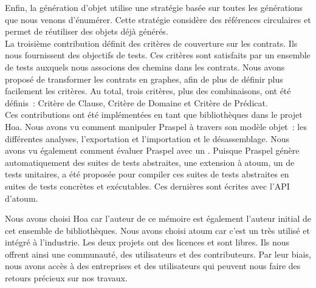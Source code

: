 Enfin, la génération d'objet utilise une stratégie basée sur toutes les
générations que nous venons d'énumérer. Cette stratégie considère des références
circulaires et permet de réutiliser des objets déjà générés. \\

La troisième contribution définit des critères de couverture sur les contrats.
Ils nous fournissent des objectifs de tests. Ces critères sont satisfaits par un
ensemble de tests auxquels nous associons des chemins dans les contrats. Nous
avons proposé de transformer les contrats en graphes, afin de plus de définir
plus facilement les critères. Au total, trois critères, plus des combinaisons,
ont été définis~: Critère de Clause, Critère de Domaine et Critère de Prédicat.
\\

Ces contributions ont été implémentées en tant que bibliothèques dans le projet
Hoa. Nous avons vu comment manipuler Praspel à travers son modèle objet~: les
différentes analyses, l'exportation et l'importation et le désassemblage. Nous
avons vu également comment évaluer Praspel avec un . Puisque Praspel génère automatiquement des suites de tests
abstraites, une extension à atoum, un  de tests unitaires,
a été proposée pour compiler ces suites de tests abstraites en suites de tests
concrètes et exécutables. Ces dernières sont écrites avec l'API d'atoum.

Nous avons choisi Hoa car l'auteur de ce mémoire est également l'auteur initial
de cet ensemble de bibliothèques. Nous avons choisi atoum car c'est un
 très utilisé et intégré à l'industrie. Les deux projets
ont des licences  et sont libres. Ils nous offrent ainsi
une communauté, des utilisateurs et des contributeurs. Par leur biais, nous
avons accès à des entreprises et des utilisateurs qui peuvent nous faire des
retours précieux sur nos travaux. \\

